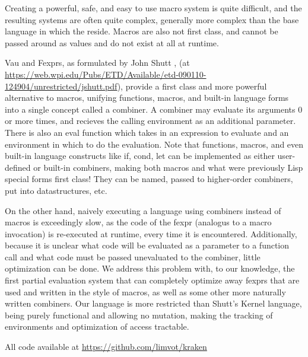\documentclass[acmsmall]{acmart}
\begin{document}
  Creating a powerful, safe, and easy to use macro system is quite difficult, and the resulting systems are often quite complex,
  generally more complex than the base language in which the reside. Macros are also not first class, and cannot be passed
  around as values and do not exist at all at runtime.

  Vau and Fexprs, as formulated by John Shutt \cite{shutt2010fexprs}, (at \url{https://web.wpi.edu/Pubs/ETD/Available/etd-090110-124904/unrestricted/jshutt.pdf}),
  provide a first class and more powerful alternative to macros, unifying functions, macros, and built-in language forms
  into a single concept called a combiner. A combiner may evaluate its arguments 0 or more times,
  and recieves the calling environment as an additional parameter. There is also an eval function which takes in an expression to evaluate
  and an environment in which to do the evaluation. Note that functions, macros, and even built-in language constructs like if, cond, let can be implemented
  as either user-defined or built-in combiners, making both macros and what were previously Lisp special forms first class! They can be named,
  passed to higher-order combiners, put into datastructures, etc.

  On the other hand, naively executing a language using combiners instead of macros is exceedingly slow,
  as the code of the fexpr (analogus to a macro invocation) is re-executed at runtime, every time it is encountered.
  Additionally, because it is unclear what code will be evaluated as a parameter to a function call and what code
  must be passed unevaluated to the combiner, little optimization can be done. We address this problem with, to our knowledge,
  the first partial evaluation system that can completely optimize away fexprs that are used and written in the style of macros,
  as well as some other more naturally written combiners. Our language is more restricted than Shutt's Kernel language, being
  purely functional and allowing no mutation, making the tracking of environments and optimization of access tractable.

  All code available at \url{https://github.com/limvot/kraken}
\end{document}
